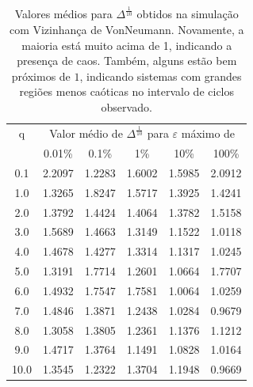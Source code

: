 \documentclass[
	12pt,				%
	openright,			%
	twoside,			%
	a4paper,			%
	english,			%
	french,				%
	spanish,			%
	brazil				%
	]{abntex2}
\begin{document}
\begin{table}[h]
  \centering
  \caption{Valores médios para $\Delta^\frac{1}{10}$ obtidos na simulação com Vizinhança de VonNeumann. Novamente, a maioria está muito acima de 1, indicando a presença de caos. Também, alguns estão bem próximos de $1$, indicando sistemas com grandes regiões menos caóticas no intervalo de ciclos observado.}
  \label{tab:mediaDeltaVonNeumann}
  \begin{tabular}{c ccccc}
    \toprule
    q & \multicolumn{5}{c}{Valor médio de $\Delta^\frac{1}{10}$ para $\varepsilon$ máximo de}\\
     & 0.01\% & 0.1\% & 1\% & 10\% & 100\%\\\midrule\midrule
    0.1 & 2.2097 &	1.2283 &	1.6002 &	1.5985 &	2.0912\\
    1.0 & 1.3265 &	1.8247 &	1.5717 &	1.3925 &	1.4241\\
    2.0 & 1.3792 &	1.4424 &	1.4064 &	1.3782 &	1.5158\\
    3.0 & 1.5689 &	1.4663 &	1.3149 &	1.1522 &	1.0118\\
    4.0 & 1.4678 &	1.4277 &	1.3314 &	1.1317 &	1.0245\\
    5.0 & 1.3191 &	1.7714 &	1.2601 &	1.0664 &	1.7707\\
    6.0 & 1.4932 &	1.7547 &	1.7581 &	1.0064 &	1.0259\\
    7.0 & 1.4846 &	1.3871 &	1.2438 &	1.0284 &	0.9679\\
    8.0 & 1.3058 &	1.3805 &	1.2361 &	1.1376 &	1.1212\\
    9.0 & 1.4717 &	1.3764 &	1.1491 &	1.0828 &	1.0164\\
    10.0& 1.3545 &	1.2322 &	1.3704 &	1.1948 &	0.9669\\\bottomrule
  \end{tabular}
\end{table}
\end{document}
